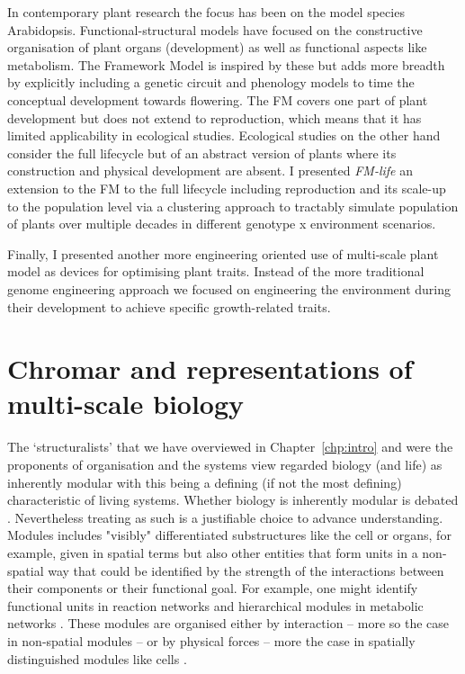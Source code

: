 In contemporary plant research the focus has been on the model species
Arabidopsis. Functional-structural models have focused on the constructive
organisation of plant organs (development) as well as functional aspects like
metabolism. The Framework Model \citep{chew_multiscale_2014} is inspired by
these but adds more breadth by explicitly including a genetic circuit and
phenology models to time the conceptual development towards flowering. The FM
covers one part of plant development but does not extend to reproduction, which
means that it has limited applicability in ecological studies. Ecological
studies on the other hand consider the full lifecycle but of an abstract version
of plants where its construction and physical development are absent. I
presented \emph{FM-life} an extension to the FM to the full lifecycle including
reproduction and its scale-up to the population level via a clustering approach
to tractably simulate population of plants over multiple decades in different
genotype x environment scenarios.

Finally, I presented another more engineering oriented use of multi-scale plant
model as devices for optimising plant traits. Instead of the more traditional
genome engineering approach we focused on engineering the environment during
their development to achieve specific growth-related traits.

\section{Chromar and representations of multi-scale biology}
The `structuralists' that we have overviewed in Chapter~\ref{chp:intro} and were
the proponents of organisation and the systems view regarded biology (and life)
as inherently modular with this being a defining (if not the most defining)
characteristic of living systems. Whether biology is inherently modular is
debated \citep{hartwell1999molecular}. %
Nevertheless treating as such is a
justifiable choice to advance understanding. Modules includes "visibly"
differentiated substructures like the cell or organs, for example, given in
spatial terms but also other entities that form units in a non-spatial way that
could be identified by the strength of the interactions between their components
or their functional goal. For example, one might identify functional units in
reaction networks \citep{ederer_approach_2003} and hierarchical modules in
metabolic networks \citep{ravasz_hierarchical_2002}. These modules are organised
either by interaction -- more so the case in non-spatial modules -- or by
physical forces -- more the case in spatially distinguished modules like cells
\citep['Biological and Physical systems' section]{simon1962architecture}.

